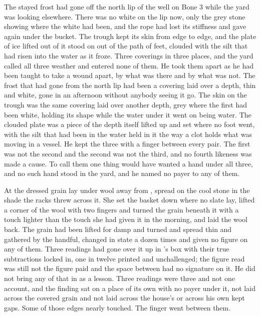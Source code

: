 The stayed frost had gone off the north lip of the well on Bone 3 while the yard was looking elsewhere. There was no white on the lip now, only the grey stone showing where the white had been, and the rope had lost its stiffness and gave again under the bucket. The trough kept its skin from edge to edge, and the plate of ice lifted out of it stood on  out of the path of feet, clouded with the silt that had risen into the water as it froze. Three coverings in three places, and the yard called all three weather and entered none of them. He took them apart as he had been taught to take a wound apart, by what was there and by what was not. The frost that had gone from the north lip had been a covering laid over a depth, thin and white, gone in an afternoon without anybody seeing it go. The skin on the trough was the same covering laid over another depth, grey where the first had been white, holding its shape while the water under it went on being water. The clouded plate was a piece of the depth itself lifted up and set where no foot went, with the silt that had been in the water held in it the way a clot holds what was moving in a vessel. He kept the three with a finger between every pair. The first was not the second and the second was not the third, and no fourth likeness was made a cause. To call them one thing would have wanted a hand under all three, and no such hand stood in the yard, and he named no payer to any of them.

At  the dressed grain lay under wool away from , spread on the cool stone in the shade the racks threw across it. She set the basket down where no slate lay, lifted a corner of the wool with two fingers and turned the grain beneath it with a touch lighter than the touch she had given it in the morning, and laid the wool back. The grain had been lifted for damp and turned and spread thin and gathered by the handful, changed in state a dozen times and given no figure on any of them. Three readings had gone over it up  in 's box with their true subtractions locked in, one in twelve printed and unchallenged; the figure read was still not the figure paid and the space between had no signature on it. He did not bring any of that in as a lesson. Three readings were three and not one account, and the finding sat on a place of its own with no payer under it, not laid across the covered grain and not laid across the house's  or across his own kept gaps. Some of those edges nearly touched. The finger went between them.


